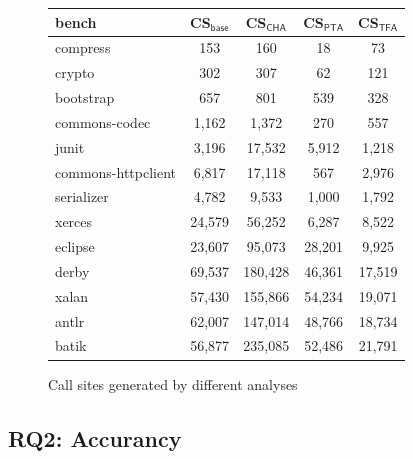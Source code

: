 \documentclass{llncs}
\begin{document}
\begin{figure}[t!]
  \centering
\begin{tabular}{lcccc}
	\hline
	\textbf{bench} & \textbf{CS$_{\textsf{base}}$} &\hspace{5pt} \textbf{CS$_{\textsf{CHA}}$}\hspace{5pt} &\hspace{5pt} \textbf{CS$_{\textsf{PTA}}$}\hspace{5pt} & \hspace{5pt} \textbf{CS$_{\textsf{TFA}}$}\hspace{5pt} \\
	\hline
	compress & 153 & 160 & 18 & 73 \\
	crypto & 302 & 307 & 62 & 121 \\
	bootstrap & 657 & 801 & 539 & 328 \\
	commons-codec & 1,162 & 1,372 & 270 & 557 \\
	junit & 3,196 & 17,532 & 5,912 & 1,218 \\
	commons-httpclient & 6,817 & 17,118 & 567 & 2,976 \\
	serializer & 4,782 & 9,533 & 1,000 & 1,792 \\
	xerces & 24,579 & 56,252 & 6,287 & 8,522 \\
	eclipse & 23,607 & 95,073 & 28,201 & 9,925 \\
	derby & 69,537 & 180,428 & 46,361 & 17,519 \\
	xalan & 57,430 & 155,866 & 54,234 & 19,071 \\
	antlr & 62,007 & 147,014 & 48,766 & 18,734 \\
	batik & 56,877 & 235,085 & 52,486 & 21,791 \\
	\hline
\end{tabular}
\caption{Call sites generated by different analyses}
\label{experiment:Callsite}
\end{figure}

\subsection{RQ2: Accurancy}\label{subsec:accurancy}
\end{document}
